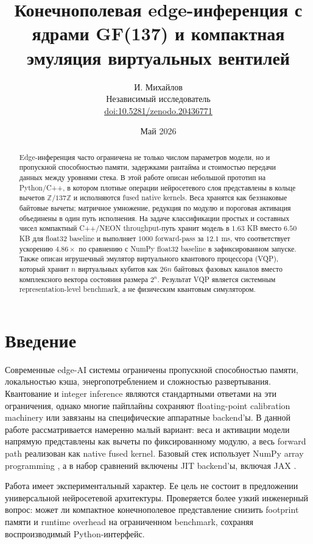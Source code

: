 \documentclass[11pt]{article}
\title{Конечнополевая edge-инференция с ядрами GF(137) и компактная эмуляция виртуальных вентилей}
\author{И. Михайлов\\
\small Независимый исследователь\\
\small \href{https://doi.org/10.5281/zenodo.20436771}{doi:10.5281/zenodo.20436771}}
\date{Май 2026}
\begin{document}
\maketitle

\begin{abstract}
Edge-инференция часто ограничена не только числом параметров модели, но и
пропускной способностью памяти, задержками рантайма и стоимостью передачи
данных между уровнями стека. В этой работе описан небольшой прототип на
Python/C++, в котором плотные операции нейросетевого слоя представлены в
кольце вычетов $\mathbb{Z}/137\mathbb{Z}$ и исполняются fused native kernels.
Веса хранятся как беззнаковые байтовые вычеты; матричное умножение, редукция по
модулю и пороговая активация объединены в один путь исполнения. На задаче
классификации простых и составных чисел компактный C++/NEON throughput-путь
хранит модель в $1.63$ KB вместо $6.50$ KB для float32 baseline и выполняет
$1000$ forward-pass за $12.1$ ms, что соответствует ускорению $4.86\times$ по
сравнению с NumPy float32 baseline в зафиксированном запуске. Также описан
игрушечный эмулятор виртуального квантового процессора (VQP), который хранит
$n$ виртуальных кубитов как $26n$ байтовых фазовых каналов вместо комплексного
вектора состояния размера $2^n$. Результат VQP является системным
representation-level benchmark, а не физическим квантовым симулятором.
\end{abstract}

\section{Введение}

Современные edge-AI системы ограничены пропускной способностью памяти,
локальностью кэша, энергопотреблением и сложностью развертывания. Квантование и
integer inference являются стандартными ответами на эти ограничения, однако
многие пайплайны сохраняют floating-point calibration machinery или завязаны на
специфические аппаратные backend'ы. В данной работе рассматривается намеренно
малый вариант: веса и активации модели напрямую представлены как вычеты по
фиксированному модулю, а весь forward path реализован как native fused kernel.
Базовый стек использует NumPy array programming \cite{numpy2020}, а в набор
сравнений включены JIT backend'ы, включая JAX \cite{jax2018}.

Работа имеет экспериментальный характер. Ее цель не состоит в предложении
универсальной нейросетевой архитектуры. Проверяется более узкий инженерный
вопрос: может ли компактное конечнополевое представление снизить footprint
памяти и runtime overhead на ограниченном benchmark, сохраняя воспроизводимый
Python-интерфейс.
\end{document}
